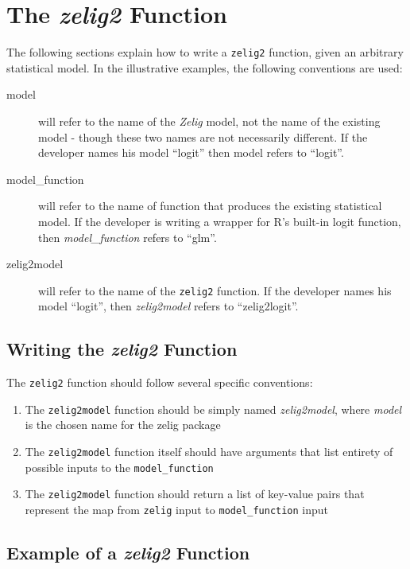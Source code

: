 \documentclass[11pt]{article}
\begin{document}

\section{The \emph{zelig2} Function}
The following sections explain how to write a {\tt zelig2} function, given an arbitrary statistical model.  In the illustrative examples, the following conventions are used:

\begin{description}
	\item[model]{will refer to the name of the \emph{Zelig} model, not the name of the existing model - though these two names are not necessarily different.  If the developer names his model ``logit'' then model refers to ``logit''.}
	\item[model\_function]{will refer to the name of function that produces the existing statistical model.  If the developer is writing a wrapper for R's built-in logit function, then \emph{model\_function} refers to ``glm''.}
	\item[zelig2model]{will refer to the name of the {\tt zelig2} function.  If the developer names his model ``logit'', then \emph{zelig2model} refers to ``zelig2logit''.}
\end{description}


\subsection{Writing the \emph{zelig2} Function}

The {\tt zelig2} function should follow several specific conventions:

\begin{enumerate}
	\item{The {\tt zelig2model} function should be simply named \emph{zelig2model}, where \emph{model} is the chosen name for the zelig package}
	\item{The {\tt zelig2model} function itself should have arguments that list entirety of possible inputs to the {\tt model\_function}}
	\item{The {\tt zelig2model} function should return a list of key-value pairs that represent the map from {\tt zelig} input to {\tt model\_function} input}
\end{enumerate}


\subsection{Example of a \emph{zelig2} Function}
\end{document}
